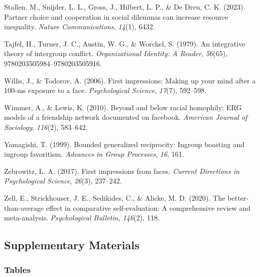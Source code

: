 \documentclass[
  man,
  floatsintext,
  longtable,
  nolmodern,
  notxfonts,
  notimes,
  draftfirst,
  colorlinks=true,linkcolor=blue,citecolor=blue,urlcolor=blue]{apa7}
\newlength{\cslhangindent}
\newenvironment{CSLReferences}[2] %
 {\begin{list}{}{%
  \setlength{\itemindent}{0pt}
  \setlength{\leftmargin}{0pt}
  \setlength{\parsep}{0pt}
  \ifodd #1
   \setlength{\leftmargin}{\cslhangindent}
   \setlength{\itemindent}{-1\cslhangindent}
  \fi
  \setlength{\itemsep}{#2\baselineskip}}}
 {\end{list}}
\begin{document}
\begin{CSLReferences}{1}{0}
Stallen, M., Snijder, L. L., Gross, J., Hilbert, L. P., \& De Dreu, C.
K. (2023). Partner choice and cooperation in social dilemmas can
increase resource inequality. \emph{Nature Communications},
\emph{14}(1), 6432.

Tajfel, H., Turner, J. C., Austin, W. G., \& Worchel, S. (1979). An
integrative theory of intergroup conflict. \emph{Organizational
Identity: A Reader}, \emph{56}(65), 9780203505984--9780203505916.

Willis, J., \& Todorov, A. (2006). First impressions: Making up your
mind after a 100-ms exposure to a face. \emph{Psychological Science},
\emph{17}(7), 592--598.

Wimmer, A., \& Lewis, K. (2010). Beyond and below racial homophily: ERG
models of a friendship network documented on facebook. \emph{American
Journal of Sociology}, \emph{116}(2), 583--642.

Yamagishi, T. (1999). Bounded generalized reciprocity: Ingroup boasting
and ingroup favoritism. \emph{Advances in Group Processes}, \emph{16},
161.

Zebrowitz, L. A. (2017). First impressions from faces. \emph{Current
Directions in Psychological Science}, \emph{26}(3), 237--242.

Zell, E., Strickhouser, J. E., Sedikides, C., \& Alicke, M. D. (2020).
The better-than-average effect in comparative self-evaluation: A
comprehensive review and meta-analysis. \emph{Psychological Bulletin},
\emph{146}(2), 118.

\end{CSLReferences}

\subsection{Supplementary Materials}\label{supplementary-materials}

\subsubsection{Tables}\label{tables}
\end{document}
